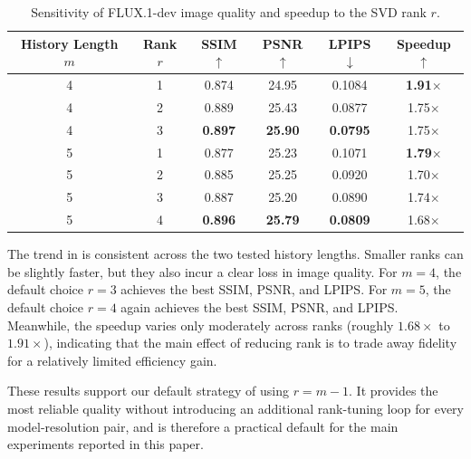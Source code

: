\begin{table}[H]
\centering
\begingroup
\setlength{\tabcolsep}{0.38em}
\renewcommand{\arraystretch}{1.06}
\begin{tabular}{MCCCCC}
\toprule
\textbf{History Length \(m\)}
    & \textbf{Rank \(r\)}
    & \textbf{SSIM$\uparrow$}
    & \textbf{PSNR$\uparrow$}
    & \textbf{LPIPS$\downarrow$}
    & \textbf{Speedup$\uparrow$} \\
 & 1 & 0.874 & 24.95 & 0.1084 & \textbf{1.91$\times$} \\
4 & 2 & 0.889 & 25.43 & 0.0877 & 1.75$\times$ \\
4 & 3 & \textbf{0.897} & \textbf{25.90} & \textbf{0.0795} & 1.75$\times$ \\
 & 1 & 0.877 & 25.23 & 0.1071 & \textbf{1.79$\times$} \\
5 & 2 & 0.885 & 25.25 & 0.0920 & 1.70$\times$ \\
5 & 3 & 0.887 & 25.20 & 0.0890 & 1.74$\times$ \\
5 & 4 & \textbf{0.896} & \textbf{25.79} & \textbf{0.0809} & 1.68$\times$ \\
\bottomrule
\end{tabular}
\endgroup
\caption{Sensitivity of FLUX.1-dev image quality and speedup to the SVD rank \(r\).}
\label{tab:app:rank-svd}
\end{table}

The trend in 
is consistent across the two tested history lengths.
Smaller ranks can be slightly faster,
but they also incur a clear loss in image quality.
For \(m=4\),
the default choice \(r=3\)
achieves the best SSIM, PSNR, and LPIPS.
For \(m=5\),
the default choice \(r=4\)
again achieves the best SSIM, PSNR, and LPIPS.
Meanwhile,
the speedup varies only moderately across ranks
(roughly \(1.68\times\) to \(1.91\times\)),
indicating that the main effect of reducing rank
is to trade away fidelity for a relatively limited efficiency gain.

These results support our default strategy of using \(r=m-1\).
It provides the most reliable quality
without introducing an additional rank-tuning loop
for every model-resolution pair,
and is therefore a practical default
for the main experiments reported in this paper.

